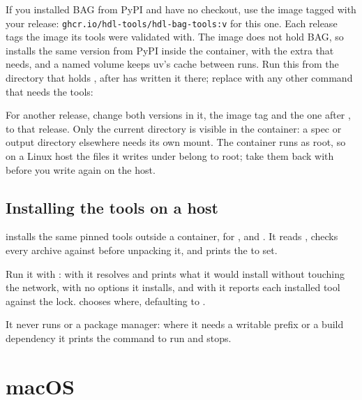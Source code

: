 If you installed BAG from PyPI and have no checkout, use the image tagged with your
release: \texttt{ghcr.io/hdl-tools/hdl-bag-tools:v\bagversion} for this one. Each release
tags the image its tools were validated with. The image does not hold BAG, so
 installs the same version from PyPI inside the container, with the
 extra that  needs, and a named volume keeps uv's cache between
runs. Run this from the directory that holds , after  has
written it there; replace  with any other  command that needs
the tools:



For another release, change both versions in it, the image tag and the one after
\code{==}, to that release. Only the current directory is visible in the container: a
spec or output directory elsewhere needs its own mount. The container runs as root, so on
a Linux host the files it writes under  belong to root; take them back with
 before you write  again on the host.

\subsection{Installing the tools on a host}
\label{sec:install-tools}

 installs the same pinned tools outside a container, for
,  and . It reads
, checks every archive against  before
unpacking it, and prints the  to set.

Run it with : with
 it resolves and prints what it would install without touching the network,
with no options it installs, and with  it reports each installed tool
against the lock.  chooses where, defaulting to
.

It never runs  or a package manager: where it needs a writable prefix or a
build dependency it prints the command to run and stops.

\section{macOS}
\label{sec:macos}


